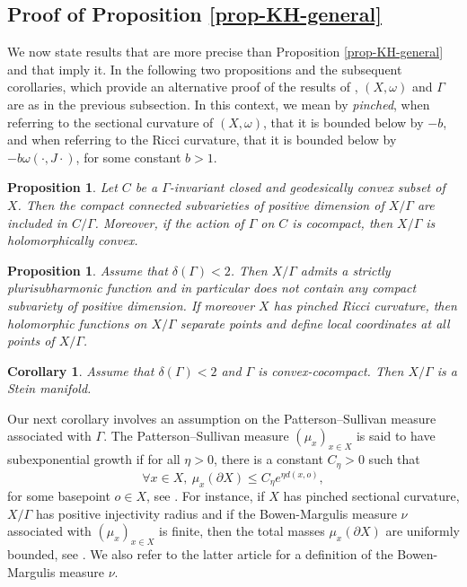 \documentclass{article}
\newtheorem{corollary}[theorem]{Corollary}
\newtheorem{proposition}[theorem]{Proposition}
\theoremstyle{definition}
\theoremstyle{remark}
\begin{document}
\subsection{Proof of Proposition \ref{prop-KH-general}}\label{ss-section-preuve-prop5}

We now state results that are more precise than Proposition \ref{prop-KH-general} and that imply it. In the following two propositions and the subsequent corollaries, which provide an alternative proof of the results of \cite{deyNoteComplexhyperbolicKleinian2020}, $(X,\omega)$ and $\Gamma$ are as in the previous subsection. In this context, we mean by \textit{pinched}, when referring to the sectional curvature of $(X,\omega)$, that it is bounded below by $-b$, and when referring to the Ricci curvature, that it is bounded below by $-b\omega(\cdot,J\cdot)$, for some constant $b>1$.

\begin{proposition}\label{prop-KH-hol-cvx}
	Let $C$ be a $\Gamma$-invariant closed and geodesically convex subset of $X$. Then the compact connected subvarieties of positive dimension of $X/\Gamma$ are included in $C/\Gamma$. Moreover, if the action of $\Gamma$ on $C$ is cocompact, then $X/\Gamma$ is holomorphically convex.
\end{proposition}

\begin{proposition}\label{prop-KH-ss-ens}
	Assume that $\delta(\Gamma)<2$. Then $X/\Gamma$ admits a strictly plurisubharmonic function and in particular does not contain any compact subvariety of positive dimension. If moreover $X$ has pinched Ricci curvature, then holomorphic functions on $X/\Gamma$ separate points and define local coordinates at all points of $X/\Gamma$.
\end{proposition}

\begin{corollary}\label{cor-cvx+delta:stein}
	Assume that $\delta(\Gamma)<2$ and $\Gamma$ is convex-cocompact. Then $X/\Gamma$ is a Stein manifold.
\end{corollary}

Our next corollary involves an assumption on the Patterson--Sullivan measure associated with $\Gamma$. The Patterson--Sullivan measure $(\mu_x)_{x\in X}$ is said to have subexponential growth if for all $\eta>0$, there is a constant $C_{\eta}>0$ such that\begin{equation*}
	\forall x\in X,\  \mu_x(\partial X) \le C_{\eta}e^{\eta d(x,o)},
\end{equation*}
for some basepoint $o\in X$, see \cite[§1.4]{connellNaturalFlowCritical2023}. For instance, if $X$ has pinched sectional curvature, $X/\Gamma$ has positive injectivity radius and if the Bowen-Margulis measure $\nu$ associated with $(\mu_x)_{x\in X}$ is finite, then the total masses $\mu_x(\partial X)$ are uniformly bounded, see \cite[Theorem 1.15]{connellNaturalFlowCritical2023}. We also refer to the latter article for a definition of the Bowen-Margulis measure $\nu$.
\end{document}
